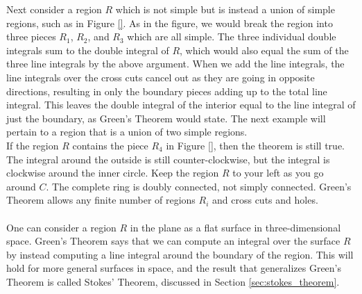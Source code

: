 Next consider a region $R$ which is not simple but is instead a union of simple regions, such as in Figure \ref{}. As in the figure, we would break the region into three pieces $R_1$, $R_2$, and $R_3$ which are all simple. The three individual double integrals sum to the double integral of $R$, which would also equal the sum of the three line integrals by the above argument. When we add the line integrals, the line integrals over the cross cuts cancel out as they are going in opposite directions, resulting in only the boundary pieces adding up to the total line integral.  This leaves the double integral of the interior equal to the line integral of just the boundary, as Green's Theorem would state. The next example will pertain to a region that is a union of two simple regions. \\

If the region $R$ contains the piece $R_4$ in Figure \ref{}, then the theorem is still true. The
integral around the outside is still counter-clockwise, but the integral is clockwise around the inner circle. Keep the region $R$ to your left as you go around $C$. The complete ring is doubly connected, not simply connected. Green's Theorem allows any finite number of regions $R_i$ and cross cuts and holes.\\

\\

One can consider a region $R$ in the plane as a flat surface in three-dimensional space. Green's Theorem says that we can compute an integral over the surface $R$ by instead computing a line integral around the boundary of the region.  This will hold for more general surfaces in space, and the result that generalizes Green's Theorem is called Stokes' Theorem, discussed in Section \ref{sec:stokes_theorem}.

